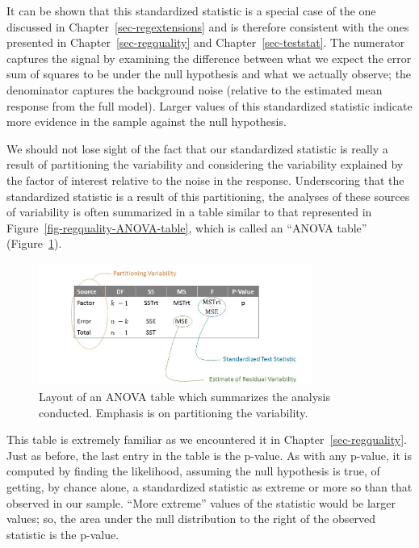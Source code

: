 \documentclass[
  letterpaper,
  DIV=11,
  numbers=noendperiod]{scrreprt}
\theoremstyle{plain}
\theoremstyle{definition}
\theoremstyle{definition}
\theoremstyle{remark}
\begin{document}
It can be shown that this standardized statistic is a special case of
the one discussed in Chapter~\ref{sec-regextensions} and is therefore
consistent with the ones presented in Chapter~\ref{sec-regquality} and
Chapter~\ref{sec-teststat}. The numerator captures the signal by
examining the difference between what we expect the error sum of squares
to be under the null hypothesis and what we actually observe; the
denominator captures the background noise (relative to the estimated
mean response from the full model). Larger values of this standardized
statistic indicate more evidence in the sample against the null
hypothesis.

We should not lose sight of the fact that our standardized statistic is
really a result of partitioning the variability and considering the
variability explained by the factor of interest relative to the noise in
the response. Underscoring that the standardized statistic is a result
of this partitioning, the analyses of these sources of variability is
often summarized in a table similar to that represented in
Figure~\ref{fig-regquality-ANOVA-table}, which is called an ``ANOVA
table'' (Figure~\ref{fig-anovateststat-anova-table}).

\begin{figure}

{\centering \includegraphics[width=0.8\textwidth,height=\textheight]{./images/ANOVAteststat-Table.jpg}

}

\caption{\label{fig-anovateststat-anova-table}Layout of an ANOVA table
which summarizes the analysis conducted. Emphasis is on partitioning the
variability.}

\end{figure}

This table is extremely familiar as we encountered it in
Chapter~\ref{sec-regquality}. Just as before, the last entry in the
table is the p-value. As with any p-value, it is computed by finding the
likelihood, assuming the null hypothesis is true, of getting, by chance
alone, a standardized statistic as extreme or more so than that observed
in our sample. ``More extreme'' values of the statistic would be larger
values; so, the area under the null distribution to the right of the
observed statistic is the p-value.
\end{document}
